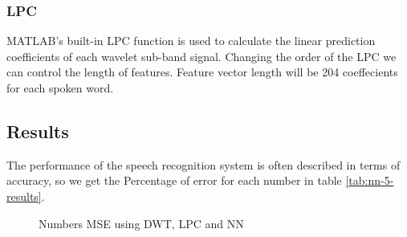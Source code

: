 \documentclass[12pt, a4paper, twoside]{report}
\begin{document}
\subsubsection{LPC}
MATLAB's built-in LPC function is used to calculate the linear prediction coefficients of each wavelet sub-band signal. Changing the order of the LPC we can control the length of features. Feature vector length will be 204 coeffecients for each spoken word.
\subsection{Results}
The performance of the speech recognition system is often described in terms of accuracy, so we get the Percentage of error for each number in table \ref{tab:nn-5-results}.
\begin{figure}[!h]
\begin{floatrow}
{%
  \caption{Numbers MSE using DWT, LPC and NN}
  \label{fig:nn-mse-1}
}
\end{floatrow}
\end{figure}
\end{document}
